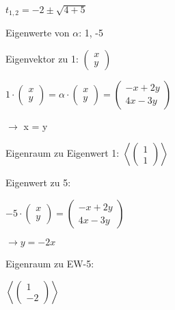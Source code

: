 \documentclass[a4paper, openany]{book}
\begin{document}
\begin{enumerate}[label=(\alph*)]
          $t_{1,2} = -2 \pm \sqrt{4+5}$

          Eigenwerte von $\alpha$: 1, -5

          \par \medskip

          \par \medskip

          Eigenvektor zu 1: $\begin{pmatrix}x \\ y \end{pmatrix}$

          $1 \cdot \begin{pmatrix}x \\ y \end{pmatrix} = \alpha \cdot \begin{pmatrix}x \\ y \end{pmatrix} = \begin{pmatrix}-x + 2y \\ 4x -3y \end{pmatrix}$

          $\rightarrow$ x = y

          \par \medskip

          \par \medskip

          Eigenraum zu Eigenwert 1: $\left \langle \begin{pmatrix}1 \\ 1 \end{pmatrix} \right \rangle$

          \par \medskip

          Eigenwert zu 5:

          $-5 \cdot \begin{pmatrix}x \\ y \end{pmatrix} = \begin{pmatrix}-x + 2y \\ 4x -3y \end{pmatrix}$

          $\rightarrow y = -2x$

          Eigenraum zu EW-5: 

          $\left \langle \begin{pmatrix}1 \\ -2 \end{pmatrix} \right \rangle$


\end{enumerate}
\end{document}

